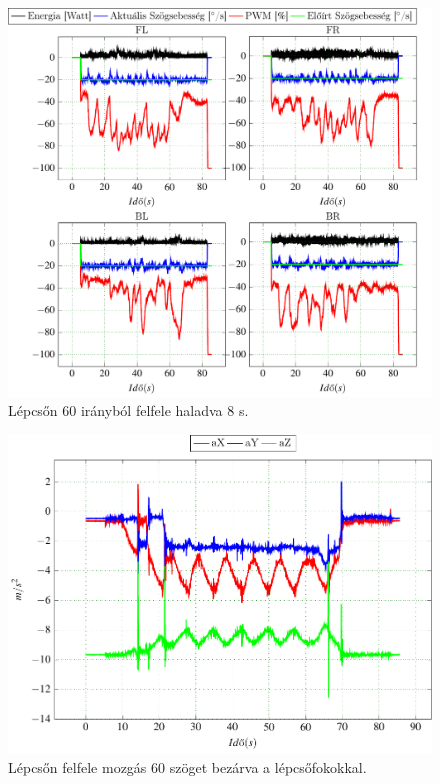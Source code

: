 \begin{figure}[H]
	\begin{center}
  		\includegraphics[scale=0.8]{tikz/LepcsoAulaSlegenFelx.pdf}
  	\end{center}
  \caption{Lépcsőn 60 \degree irányból felfele haladva 8 s.}
  \label{fig:LepcsoAulaSlegenFelx}
\end{figure}

\begin{figure}[H]
  \begin{center}
  	\includegraphics[scale=0.6]{tikz/ImuLepcsoAulaSlegenFel1.pdf}
  \end{center}
  \caption{Lépcsőn felfele mozgás 60 \degree szöget bezárva a lépcsőfokokkal.}
  \label{fig:ImuLepcsoAulaSlegenFel1}
\end{figure}















